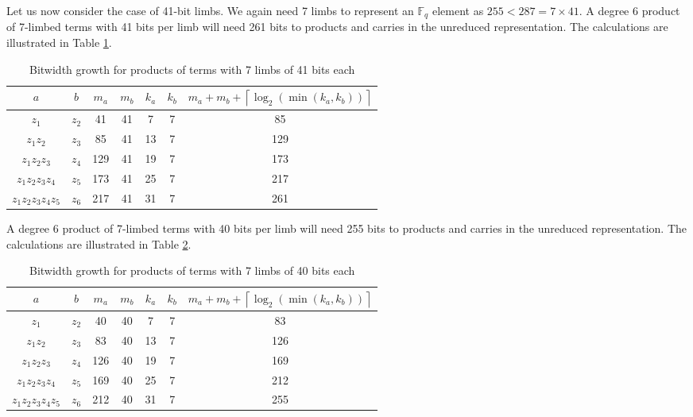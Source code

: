 \documentclass[a4paper, 12pt]{article}
\begin{document}
Let us now consider the case of 41-bit limbs. We again need 7 limbs to represent an $\mathbb{F}_q$ element as $255 < 287 = 7\times 41$. A degree 6 product of 7-limbed terms with 41 bits per limb will need 261 bits to products and carries in the unreduced representation. The calculations are illustrated in Table \ref{tab:limb41}.
\begin{table}[h]
  \centering
  \begin{tabular}{c|c|c|c|c|c|c}
    $a$ & $b$ & $m_a$ & $m_b$ & $k_a$ & $k_b$ & $m_a+m_b+\left\lceil \log_2 \left( \min\left( k_a, k_b \right) \right) \right\rceil$ \\ \hline
    $z_1$ & $z_2$ & 41 & 41 & 7 & 7 & 85 \\ \hline
    $z_1z_2$ & $z_3$ & 85 & 41 & 13 & 7 & 129 \\ \hline
    $z_1z_2z_3$ & $z_4$ & 129 & 41 & 19 & 7 & 173 \\ \hline
    $z_1z_2z_3z_4$ & $z_5$ & 173 & 41 & 25 & 7 & 217 \\ \hline
    $z_1z_2z_3z_4z_5$ & $z_6$ & 217 & 41 & 31 & 7 & 261 \\ \hline
  \end{tabular}
  \caption{Bitwidth growth for products of terms with 7 limbs of 41 bits each}
  \label{tab:limb41}
\end{table}

A degree 6 product of 7-limbed terms with 40 bits per limb will need 255 bits to products and carries in the unreduced representation. The calculations are illustrated in Table \ref{tab:limb40}.
\begin{table}[h]
  \centering
  \begin{tabular}{c|c|c|c|c|c|c}
    $a$ & $b$ & $m_a$ & $m_b$ & $k_a$ & $k_b$ & $m_a+m_b+\left\lceil \log_2 \left( \min\left( k_a, k_b \right) \right) \right\rceil$ \\ \hline
    $z_1$ & $z_2$ & 40 & 40 & 7 & 7 & 83 \\ \hline
    $z_1z_2$ & $z_3$ & 83 & 40 & 13 & 7 & 126 \\ \hline
    $z_1z_2z_3$ & $z_4$ & 126 & 40 & 19 & 7 & 169 \\ \hline
    $z_1z_2z_3z_4$ & $z_5$ & 169 & 40 & 25 & 7 & 212 \\ \hline
    $z_1z_2z_3z_4z_5$ & $z_6$ & 212 & 40 & 31 & 7 & 255 \\ \hline
  \end{tabular}
  \caption{Bitwidth growth for products of terms with 7 limbs of 40 bits each}
  \label{tab:limb40}
\end{table}
\end{document}
